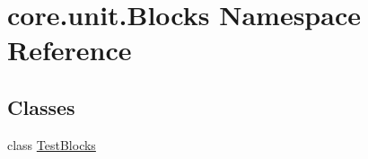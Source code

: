\hypertarget{namespacecore_1_1unit_1_1Blocks}{\section{core.\-unit.\-Blocks Namespace Reference}
\label{namespacecore_1_1unit_1_1Blocks}
}
\subsection*{Classes}
\begin{DoxyCompactItemize}
\item 
class \hyperlink{classcore_1_1unit_1_1Blocks_1_1TestBlocks}{Test\-Blocks}
\end{DoxyCompactItemize}
